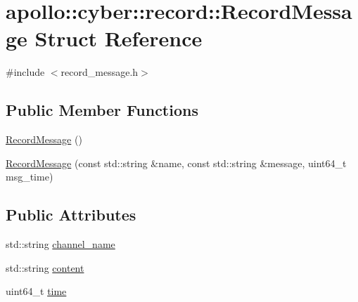 \hypertarget{structapollo_1_1cyber_1_1record_1_1RecordMessage}{\section{apollo\-:\-:cyber\-:\-:record\-:\-:Record\-Message Struct Reference}
\label{structapollo_1_1cyber_1_1record_1_1RecordMessage}
}


{\ttfamily \#include $<$record\-\_\-message.\-h$>$}

\subsection*{Public Member Functions}
\begin{DoxyCompactItemize}
\item 
\hyperlink{structapollo_1_1cyber_1_1record_1_1RecordMessage_acef87dbe955c2cd31d2f56f350fa1419}{Record\-Message} ()
\item 
\hyperlink{structapollo_1_1cyber_1_1record_1_1RecordMessage_a4230c3d9d849ae17c9abfc998180ab20}{Record\-Message} (const std\-::string \&name, const std\-::string \&message, uint64\-\_\-t msg\-\_\-time)
\end{DoxyCompactItemize}
\subsection*{Public Attributes}
\begin{DoxyCompactItemize}
\item 
std\-::string \hyperlink{structapollo_1_1cyber_1_1record_1_1RecordMessage_a4e9bb68fc38cab41f416a7ad386ce088}{channel\-\_\-name}
\item 
std\-::string \hyperlink{structapollo_1_1cyber_1_1record_1_1RecordMessage_a0de1a97f8e498da5378a9ff880700ee2}{content}
\item 
uint64\-\_\-t \hyperlink{structapollo_1_1cyber_1_1record_1_1RecordMessage_a35060d68dd1506845902a6f9b91c623b}{time}
\end{DoxyCompactItemize}


